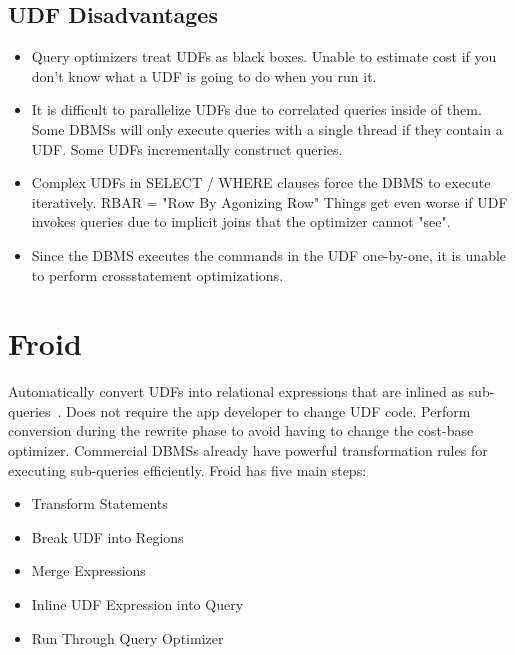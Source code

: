 \documentclass[11pt]{article}
\begin{document}
\subsection*{UDF Disadvantages}
\begin{itemize}
	\item Query optimizers treat UDFs as black boxes. 
	Unable to estimate cost if you don't know what a UDF is going to do when you run it.
	
	\item It is difficult to parallelize UDFs due to correlated queries inside of them.
	Some DBMSs will only execute queries with a single thread if they contain a UDF.
	Some UDFs incrementally construct queries.
	
	\item Complex UDFs in SELECT / WHERE clauses force the DBMS to execute iteratively.
	RBAR = "Row By Agonizing Row"
	Things get even worse if UDF invokes queries due to implicit joins that the optimizer cannot "see".
	
	\item Since the DBMS executes the commands in the UDF one-by-one, it is unable to perform crossstatement optimizations.
\end{itemize}

\section{Froid}
Automatically convert UDFs into relational expressions that are inlined as sub-queries~\cite{Ramachandra2017}. Does not require the app developer to change UDF code. Perform conversion during the rewrite phase to avoid having to change the cost-base optimizer. Commercial DBMSs already have powerful transformation rules for executing sub-queries efficiently.
Froid has five main steps:
\begin{itemize}
	\item Transform Statements
	\item Break UDF into Regions
	\item Merge Expressions
	\item Inline UDF Expression into Query
	\item Run Through Query Optimizer
\end{itemize}
\end{document}
